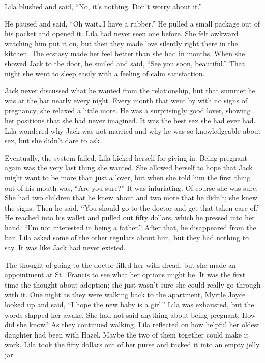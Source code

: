 \documentclass[
  american,
  letterpaper,
]{book}
\begin{document}
Lila blushed and said, ``No, it's nothing. Don't worry about it.''

He paused and said, ``Oh wait\ldots I have a rubber.'' He pulled a small
package out of his pocket and opened it. Lila had never seen one before.
She felt awkward watching him put it on, but then they made love
silently right there in the kitchen. The ecstasy made her feel better
than she had in months. When she showed Jack to the door, he smiled and
said, ``See you soon, beautiful.'' That night she went to sleep easily
with a feeling of calm satisfaction.

Jack never discussed what he wanted from the relationship, but that
summer he was at the bar nearly every night. Every month that went by
with no signs of pregnancy, she relaxed a little more. He was a
surprisingly good lover, showing her positions that she had never
imagined. It was the best sex she had ever had. Lila wondered why Jack
was not married and why he was so knowledgeable about sex, but she
didn't dare to ask.

Eventually, the system failed. Lila kicked herself for giving in. Being
pregnant again was the very last thing she wanted. She allowed herself
to hope that Jack might want to be more than just a lover, but when she
told him the first thing out of his mouth was, ``Are you sure?'' It was
infuriating. Of course she was sure. She had two children that he knew
about and two more that he didn't; she knew the signs. Then he said,
``You should go to the doctor and get that taken care of.'' He reached
into his wallet and pulled out fifty dollars, which he pressed into her
hand. ``I'm not interested in being a father.'' After that, he
disappeared from the bar. Lila asked some of the other regulars about
him, but they had nothing to say. It was like Jack had never existed.

The thought of going to the doctor filled her with dread, but she made
an appointment at St.~Francis to see what her options might be. It was
the first time she thought about adoption; she just wasn't sure she
could really go through with it. One night as they were walking back to
the apartment, Myrtle Joyce looked up and said, ``I hope the new baby is
a girl.'' Lila was exhausted, but the words slapped her awake. She had
not said anything about being pregnant. How did she know? As they
continued walking, Lila reflected on how helpful her oldest daughter had
been with Hazel. Maybe the two of them together could make it work. Lila
took the fifty dollars out of her purse and tucked it into an empty
jelly jar.
\end{document}
